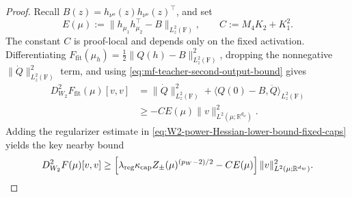 \begin{proof}
Recall \(B(z)=h_{\nu^o}(z)h_{\nu^o}(z)^\top\), and set
\[
 E(\mu):=\|h_{\mu_1}h_{\mu_2}^\top-B\|_{L^2_z(\mathrm F)},
 \qquad C:=M_4K_2+K_1^2.
\]
The constant \(C\) is proof-local and depends only on the fixed activation.
Differentiating
\(F_{\mathrm{fit}}(\mu_h)=\frac12\|Q(h)-B\|_{L^2_z(\mathrm F)}^2\),
dropping the nonnegative \(\|\dot Q\|_{L^2_z(\mathrm F)}^2\) term, and using
\cref{eq:mf-teacher-second-output-bound} gives
\begin{align*}
 D_{W_2}^2F_{\mathrm{fit}}(\mu)[v,v]
 &=\|\dot Q\|_{L^2_z(\mathrm F)}^2
   +\langle Q(0)-B,\ddot Q\rangle_{L^2_z(\mathrm F)}\\
 &\ge-CE(\mu)\|v\|_{L^2(\mu;\mathbb R^{d_w})}^2.
\end{align*}
Adding the regularizer estimate in
\cref{eq:W2-power-Hessian-lower-bound-fixed-caps} yields the key nearby
bound
\begin{equation}
\label{eq:mf-teacher-nearby-curvature-bound}
 D_{W_2}^2F(\mu)[v,v]
 \ge\left[
   \lambda_{\mathrm{reg}}\kappa_{\mathrm{cap}}Z_\pm(\mu)^{(p_W-2)/2}
   -CE(\mu)
 \right]\|v\|_{L^2(\mu;\mathbb R^{d_w})}^2.
\end{equation}


\end{proof}
